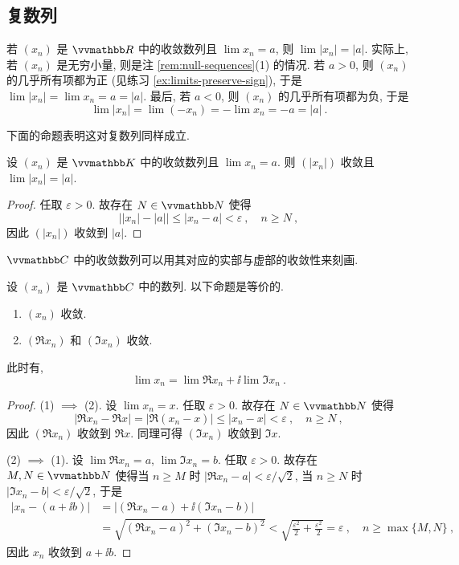 \subsection{复数列}

若 \((x_n)\) 是 \(\R\) 中的收敛数列且 \(\lim x_n = a\), 则 \(\lim |x_n| = |a|\). 实际上, 若 \((x_n)\) 是无穷小量, 则是注 \ref{rem:null-sequences}(1) 的情况. 若 \(a > 0\), 则 \((x_n)\) 的几乎所有项都为正 (见练习 \ref{ex:limits-preserve-sign}), 于是 \(\lim |x_n| = \lim x_n = a = |a|\). 最后, 若 \(a < 0\), 则 \((x_n)\) 的几乎所有项都为负, 于是
\[
    \lim |x_n| = \lim(- x_n) = - \lim x_n = - a = |a|\ .
\]

下面的命题表明这对复数列同样成立.

\begin{proposition}\label{prop:sequence-convergence-then-abs-convergence}
    设 \((x_n)\) 是 \(\K\) 中的收敛数列且 \(\lim x_n = a\). 则 \((|x_n|)\) 收敛且 \(\lim |x_n| = |a|\).
\end{proposition}

\begin{proof}
    任取 \(\varepsilon > 0\). 故存在 \(N \in \N\) 使得
    \[
        \bigl||x_n| - |a|\bigr| \leq |x_n - a| < \varepsilon\ ,\quad n \geq N\ ,
    \]
    因此 \((|x_n|)\) 收敛到 \(|a|\).
\end{proof}

\(\C\) 中的收敛数列可以用其对应的实部与虚部的收敛性来刻画.

\begin{proposition}\label{prop:convergence-of-real-and-imaginary-parts}
    设 \((x_n)\) 是 \(\C\) 中的数列. 以下命题是等价的.
    \begin{enumerate}
        \item \((x_n)\) 收敛.
        \item \((\Re x_n)\) 和 \((\Im x_n)\) 收敛.
    \end{enumerate}
    此时有,
    \[
        \lim x_n = \lim \Re x_n + \ii \lim \Im x_n\ .
    \]
\end{proposition}

\begin{proof}
    (1) \(\implies\) (2). 设 \(\lim x_n = x\). 任取 \(\varepsilon > 0\). 故存在 \(N \in \N\) 使得
    \[
        |\Re x_n - \Re x| = |\Re(x_n - x)| \leq |x_n - x| < \varepsilon\ ,\quad n \geq N\ ,
    \]
    因此 \((\Re x_n)\) 收敛到 \(\Re x\). 同理可得 \((\Im x_n)\) 收敛到 \(\Im x\).

    (2) \(\implies\) (1). 设 \(\lim \Re x_n = a\), \(\lim \Im x_n = b\). 任取 \(\varepsilon > 0\). 故存在 \(M, N \in \N\) 使得当 \(n \geq M\) 时 \(|\Re x_n - a| < \varepsilon / \sqrt{2}\), 当 \(n \geq N\) 时 \(|\Im x_n - b| < \varepsilon / \sqrt{2}\), 于是
    \begin{align*}
        |x_n - (a + \ii b)| &= |(\Re x_n - a) + \ii (\Im x_n - b)| \\
        &= \sqrt{(\Re x_n - a)^2 + (\Im x_n - b)^2} < \sqrt{\frac{\varepsilon^2}{2} + \frac{\varepsilon^2}{2}} = \varepsilon\ ,\quad n \geq \max\{M, N\}\ ,
    \end{align*}
    因此 \(x_n\) 收敛到 \(a + \ii b\).
\end{proof}

